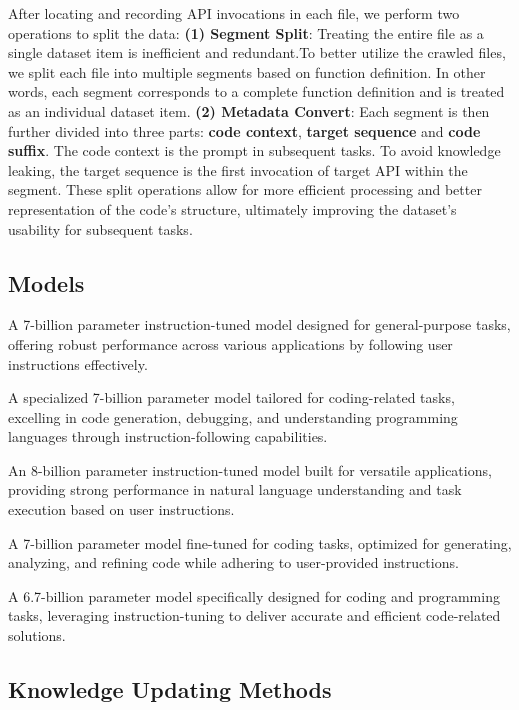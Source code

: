 After locating and recording API invocations in each file, we perform two operations to split the data:
\textbf{(1) Segment Split}: 
Treating the entire file as a single dataset item is inefficient and redundant.To better utilize the crawled files, we split each file into multiple segments based on function definition. In other words, each segment corresponds to a complete function definition and is treated as an individual dataset item. 
\textbf{(2) Metadata Convert}: 
Each segment is then further divided into three parts: \textbf{code context}, \textbf{target sequence} and \textbf{code suffix}. The code context is the prompt in subsequent tasks. To avoid knowledge leaking, the target sequence is the first invocation of target API within the segment.
These split operations allow for more efficient processing and better representation of the code's structure, ultimately improving the dataset's usability for subsequent tasks.

\subsection{Models}
A 7-billion parameter instruction-tuned model designed for general-purpose tasks, offering robust performance across various applications by following user instructions effectively.

A specialized 7-billion parameter model tailored for coding-related tasks, excelling in code generation, debugging, and understanding programming languages through instruction-following capabilities.

An 8-billion parameter instruction-tuned model built for versatile applications, providing strong performance in natural language understanding and task execution based on user instructions.

A 7-billion parameter model fine-tuned for coding tasks, optimized for generating, analyzing, and refining code while adhering to user-provided instructions.

A 6.7-billion parameter model specifically designed for coding and programming tasks, leveraging instruction-tuning to deliver accurate and efficient code-related solutions.

\subsection{Knowledge Updating Methods}
